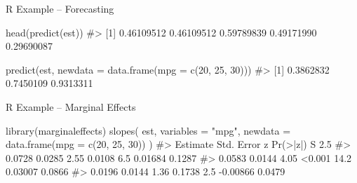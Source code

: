 \documentclass[aspectratio=169,t,11pt,table]{beamer}
\begin{document}

\begin{frame}[fragile]{R Example -- Forecasting}
  \begin{codeblock}
head(predict(est))
#> [1] 0.46109512 0.46109512 0.59789839 0.49171990 0.29690087 

predict(est, newdata = data.frame(mpg = c(20, 25, 30)))
#> [1] 0.3862832 0.7450109 0.9313311
  \end{codeblock}
\end{frame}

\begin{frame}[fragile]{R Example -- Marginal Effects}
  \begin{codeblock}
library(marginaleffects)
slopes(
  est, variables = "mpg",
  newdata = data.frame(mpg = c(20, 25, 30))
)
#> Estimate  Std. Error     z  Pr(>|z|)     S     2.5 %
#>   0.0728      0.0285  2.55    0.0108   6.5   0.01684  0.1287
#>   0.0583      0.0144  4.05    <0.001  14.2   0.03007  0.0866
#>   0.0196      0.0144  1.36    0.1738   2.5  -0.00866  0.0479
  \end{codeblock}
\end{frame}

\end{document}
